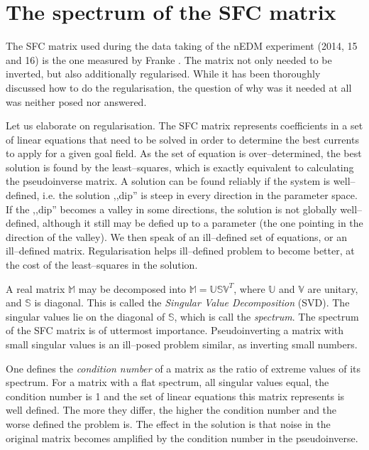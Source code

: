 \section{The spectrum of the SFC matrix}
\label{sec:nedm_sfc_matrix}
The SFC matrix used during the data taking of the nEDM experiment (2014, 15 and 16) is the one measured by Franke \cite{Franke2013}. The matrix not only needed to be inverted, but also additionally regularised. While it has been thoroughly discussed how to do the regularisation, the question of why was it needed at all was neither posed nor answered.

Let us elaborate on regularisation. The SFC matrix represents coefficients in a set of linear equations that need to be solved in order to determine the best currents to apply for a given goal field. As the set of equation is over--determined, the best solution is found by the least--squares, which is exactly equivalent to calculating the pseudoinverse matrix. A solution can be found reliably if the system is well--defined, i.e. the solution ,,dip'' is steep in every direction in the parameter space. If the ,,dip'' becomes a valley in some directions, the solution is not globally well--defined, although it still may be defied up to a parameter (the one pointing in the direction of the valley). We then speak of an ill--defined set of equations, or an ill--defined matrix. Regularisation helps ill--defined problem to become better, at the cost of the least--squares in the solution.


A real matrix $\mathbb{M}$ may be decomposed into $\mathbb{M} = \mathbb{U} \mathbb{S} \mathbb{V}^T$, where $\mathbb{U}$ and $\mathbb{V}$ are unitary, and $\mathbb{S}$ is diagonal. This is called the \emph{Singular Value Decomposition} (SVD). The singular values lie on the diagonal of $\mathbb{S}$, which is call the \emph{spectrum}. The spectrum of the SFC matrix is of uttermost importance. Pseudoinverting a matrix with small singular values is an ill--posed problem similar, as inverting small numbers.

One defines the \emph{condition number} of a matrix as the ratio of extreme values of its spectrum. For a matrix with a flat spectrum, all singular values equal, the condition number is 1 and the set of linear equations this matrix represents is well defined. The more they differ, the higher the condition number and the worse defined the problem is. The effect in the solution is that noise in the original matrix becomes amplified by the condition number in the pseudoinverse.


